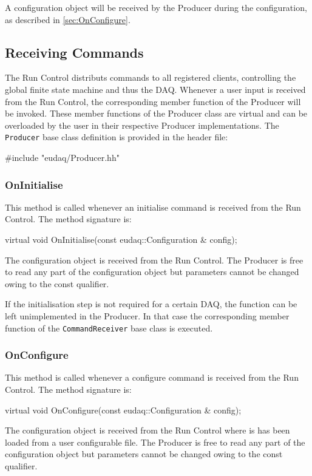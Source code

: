 A configuration object will be received by the Producer during the configuration,
as described in \autoref{sec:OnConfigure}.

\subsection{Receiving Commands}
The Run Control distributs commands to all registered clients, controlling the global finite state machine and thus the DAQ.
Whenever a user input is received from the Run Control, the corresponding member function of the Producer will be invoked.
These member functions of the Producer class are virtual and can be overloaded by the user in their respective Producer implementations.
The \texttt{Producer} base class definition is provided in the header file:
\begin{listing}
#include "eudaq/Producer.hh"
\end{listing}

\subsubsection{OnInitialise}
This method is called whenever an initialise command is received from the Run Control.
The method signature is:
\begin{listing}
virtual void OnInitialise(const eudaq::Configuration & config);
\end{listing}

The configuration object is received from the Run Control. The Producer is free to read any part of the configuration object but parameters cannot be changed owing to the const qualifier.

If the initialisation step is not required for a certain DAQ, the function can be left unimplemented in the Producer. In that case the corresponding member function of the \texttt{CommandReceiver} base class is executed.

\subsubsection{OnConfigure}\label{sec:OnConfigure}
This method is called whenever a configure command is received from the Run Control.
The method signature is:
\begin{listing}
virtual void OnConfigure(const eudaq::Configuration & config);
\end{listing}

The configuration object is received from the Run Control where is has been loaded from a user configurable file. The Producer is free to read any part of the configuration object but parameters cannot be changed owing to the const qualifier.


